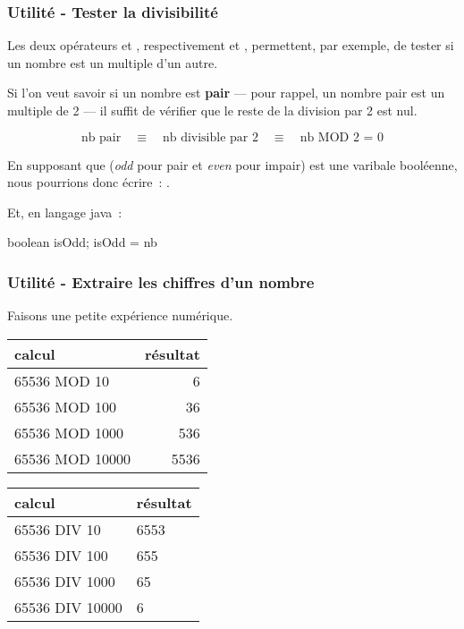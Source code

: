 			
			
		\subsubsection{Utilité - Tester la divisibilité}
		
			Les deux opérateurs  et , respectivement \pc{/} et
			\pc{\%}, permettent, par exemple, de tester si un nombre est un
			multiple d’un autre.

			Si l'on veut savoir si un nombre est \textbf{pair}
			— pour rappel, un nombre pair est un multiple de 2 — il suffit 
			de vérifier que le reste de la division par 2 est nul.
			
			\[
			\textrm{nb pair} 
				\quad\equiv\quad \textrm{nb divisible par 2} 
				\quad\equiv\quad \textrm{nb MOD 2 = 0} 
			\]
			
			En supposant que  (\textit{odd} pour pair et \textit{even}
			pour impair) est une varibale booléenne, nous pourrions donc
			écrire~: .

			Et, en langage java~:

			\begin{java}
boolean isOdd;
isOdd = nb %
			\end{java}

		\subsubsection{Utilité - Extraire les chiffres d’un nombre}
		
			Faisons une petite expérience numérique.
			\begin{center}
			\begin{tabular}{|l|r|}\hline
				\rowcolor{black!20}
				calcul & résultat \\
				\hline
				65536 MOD 10 & 6 \\  
				65536 MOD 100 & 36 \\  
				65536 MOD 1000 & 536 \\  
				65536 MOD 10000 & 5536 \\ 
				\hline 
			\end{tabular}
			\qquad
			\begin{tabular}{|l|l|}\hline
				\rowcolor{black!20}
				calcul & résultat \\
				\hline
				65536 DIV 10 & 6553 \\  
				65536 DIV 100 & 655 \\  
				65536 DIV 1000 & 65 \\  
				65536 DIV 10000 & 6 \\ 
				\hline 
			\end{tabular}
			\end{center}
		
